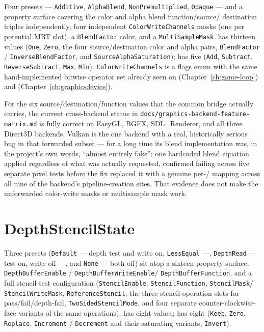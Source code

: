 Four presets --- \texttt{Additive}, \texttt{AlphaBlend}, \texttt{NonPremultiplied},
\texttt{Opaque} --- and a property surface covering the color and alpha blend function/source/%
destination triples independently, four independent \texttt{ColorWriteChannels} masks (one
per potential MRT slot), a \texttt{BlendFactor} color, and a \texttt{MultiSampleMask}.
 has thirteen values (\texttt{One}, \texttt{Zero}, the four
source/destination color and alpha pairs, \texttt{BlendFactor} / \texttt{InverseBlendFactor},
and \texttt{SourceAlphaSaturation});  has five (\texttt{Add},
\texttt{Subtract}, \texttt{ReverseSubtract}, \texttt{Max}, \texttt{Min}).
\texttt{ColorWriteChannels} is a flags enum with the same hand-implemented bitwise operator
set already seen on  (Chapter~\ref{ch:game-loop}) and
 (Chapter~\ref{ch:graphicsdevice}).

For the six source/destination/function values that the common bridge actually carries, the
current cross-backend status in \texttt{docs/graphics-backend-feature-matrix.md} is fully
correct on EasyGL, BGFX, SDL\_Renderer, and all three Direct3D backends. Vulkan is the one
backend with a real, historically serious bug in that forwarded subset --- for a long time its
blend implementation was, in the project's own words, ``almost entirely fake'': one hardcoded
blend equation applied regardless of what was actually requested, confirmed failing across five
separate pixel tests before the fix replaced it with a genuine per-/%
 mapping across all nine of the backend's pipeline-creation sites. That
evidence does not make the unforwarded color-write masks or multisample mask work.

\section{DepthStencilState}

Three presets (\texttt{Default} --- depth test and write on, \texttt{LessEqual} ---,
\texttt{DepthRead} --- test on, write off ---, and \texttt{None} --- both off) sit atop a
sixteen-property surface: \texttt{DepthBufferEnable} / \texttt{DepthBufferWriteEnable}/%
\texttt{DepthBufferFunction}, and a full stencil-test configuration
(\texttt{StencilEnable}, \texttt{StencilFunction}, \texttt{StencilMask}/%
\texttt{StencilWriteMask}, \texttt{ReferenceStencil}, the three stencil-operation slots for
pass/fail/depth-fail, \texttt{TwoSidedStencilMode}, and four separate counter-clockwise-face
variants of the same operations).  has eight values;
 has eight (\texttt{Keep}, \texttt{Zero}, \texttt{Replace},
\texttt{Increment} / \texttt{Decrement} and their saturating variants, \texttt{Invert}).

